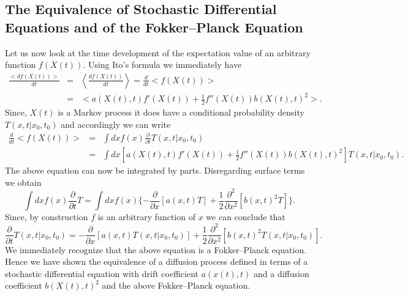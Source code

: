 \subsection{The Equivalence of Stochastic Differential Equations 
  and of the Fokker--Planck Equation}
Let us now look at the time development of the expectation value 
of an arbitrary function
$f(X(t))$.
Using Ito's formula we immediately have
\begin{eqnarray*}
\frac{<df(X(t))>}{dt} & = & \left< \frac{df(X(t))}{dt} \right> = 
               \frac{d}{dt} <f(X(t)) > \\
       & = & < a(X(t),t) f'(X(t)) +   \frac{1}{2} f''(X(t)) b(X(t),t)^2   >.
\end{eqnarray*} 
Since, $X(t)$ is a Markov process it does have a conditional
probability density $T(x,t|x_0,t_0)$ and accordingly we can write
\begin{eqnarray*}
\frac{d}{dt} <f(X(t)) > &=& \int dx f(x) \frac{\partial}{\partial t} 
         T(x,t|x_0,t_0) \\
          & = & \int dx 
       [a(X(t),t) f'(X(t)) +   \frac{1}{2} f''(X(t)) b(X(t),t)^2] T(x,t|x_0,t_0).
\end{eqnarray*}
The above equation can now be integrated by parts. Disregarding
surface terms we obtain
\begin{equation*}
\int dx f(x) \frac{\partial}{\partial t} T = \int dx f(x)
   \{ - \frac{\partial}{\partial x}[a(x,t)T] + \frac{1}{2} 
        \frac{\partial^2}{\partial x^2}[b(x,t)^2 T] \}.
\end{equation*}
Since, by construction $f$ is an arbitrary function of $x$ we can
conclude that
\begin{equation*}
 \frac{\partial}{\partial t} T(x,t|x_0,t_0) =
    - \frac{\partial}{\partial x}[a(x,t)T(x,t|x_0,t_0)] + \frac{1}{2} 
        \frac{\partial^2}{\partial x^2}[b(x,t)^2 T(x,t|x_0,t_0)].
\end{equation*}
We immediately recognize that the above equation is a Fokker--Planck
equation. Hence we have shown the equivalence of a diffusion
process defined in terms of a stochastic differential equation with
drift coefficient $a(x(t),t)$ and a diffusion coefficient
$b(X(t),t)^2$ and the above Fokker--Planck equation.

